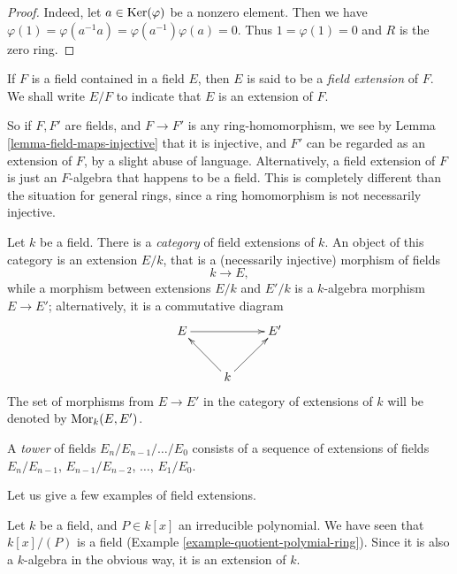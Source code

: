 \begin{proof}
Indeed, let $a \in \mathop{\mathrm{Ker}}(\varphi)$ be a nonzero element. Then we have
$\varphi(1) = \varphi(a^{-1} a) = \varphi(a^{-1}) \varphi(a) = 0$.
Thus $1 = \varphi(1) = 0$ and $R$ is the zero ring.
\end{proof}

\begin{definition}
\label{definition-extension}
If $F$ is a field contained in a field $E$, then $E$ is said
to be a {\it field extension} of $F$. We shall write $E/F$ to indicate
that $E$ is an extension of $F$.
\end{definition}

\noindent
So if $F, F'$ are fields, and $F \to F'$ is any ring-homomorphism, we see by
Lemma \ref{lemma-field-maps-injective} that it is injective, and $F'$ can be
regarded as an extension of $F$, by a slight abuse of language. Alternatively,
a field extension of $F$ is just an $F$-algebra that happens to be a field.
This is completely different than the situation for general rings, since a
ring homomorphism is not necessarily injective.

\medskip\noindent
Let $k$ be a field. There is a {\it category} of field extensions of $k$.
An object of this category is an extension $E/k$, that is a
(necessarily injective) morphism of fields
$$
k \to E,
$$
while a morphism between extensions $E/k$ and $E'/k$ is a $k$-algebra
morphism $E \to E'$; alternatively, it is a commutative diagram
$$
\xymatrix{
E \ar[rr] & & E' \\
& k \ar[ru] \ar[lu] &
}
$$
The set of morphisms from $E \to E'$ in the category of extensions of $k$
will be denoted by $\mathop{\mathrm{Mor}}\nolimits_k(E, E')$.

\begin{definition}
\label{definition-tower}
A {\it tower} of fields $E_n/E_{n - 1}/\ldots/E_0$ consists of a sequence of
extensions of fields
$E_n/E_{n - 1}$, $E_{n - 1}/E_{n - 2}$, $\ldots$, $E_1/E_0$.
\end{definition}

\noindent
Let us give a few examples of field extensions.

\begin{example}
\label{example-monogenic-extension}
Let $k$ be a field, and $P \in k[x]$ an irreducible polynomial. We have
seen that $k[x]/(P)$ is a field (Example \ref{example-quotient-polymial-ring}).
Since it is also a $k$-algebra in the obvious way, it is an extension of $k$.
\end{example}

